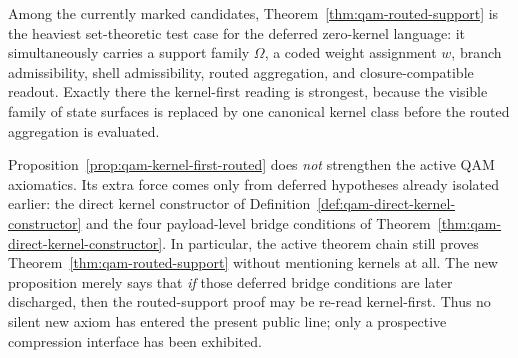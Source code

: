 \begin{remark}
Among the currently marked candidates, Theorem~\ref{thm:qam-routed-support} is the heaviest set-theoretic test case for the deferred zero-kernel language: it simultaneously carries a support family $\Omega$, a coded weight assignment $w$, branch admissibility, shell admissibility, routed aggregation, and closure-compatible readout. Exactly there the kernel-first reading is strongest, because the visible family of state surfaces is replaced by one canonical kernel class before the routed aggregation is evaluated.
\end{remark}


\begin{remark}\label{rem:qam-kernel-first-routed-audit}
Proposition~\ref{prop:qam-kernel-first-routed} does \emph{not} strengthen the active QAM axiomatics. Its extra force comes only from deferred hypotheses already isolated earlier: the direct kernel constructor of Definition~\ref{def:qam-direct-kernel-constructor} and the four payload-level bridge conditions of Theorem~\ref{thm:qam-direct-kernel-constructor}. In particular, the active theorem chain still proves Theorem~\ref{thm:qam-routed-support} without mentioning kernels at all. The new proposition merely says that \emph{if} those deferred bridge conditions are later discharged, then the routed-support proof may be re-read kernel-first. Thus no silent new axiom has entered the present public line; only a prospective compression interface has been exhibited.
\end{remark}

